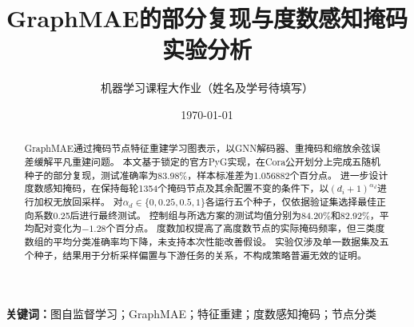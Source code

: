 \documentclass[UTF8,a4paper,zihao=-4,fontset=fandol]{ctexart}
\title{GraphMAE的部分复现与度数感知掩码实验分析}
\author{机器学习课程大作业（姓名及学号待填写）}
\date{\today}
\numberwithin{equation}{section}
\numberwithin{figure}{section}
\numberwithin{table}{section}
\newif\ifincludeFullAppendix
\begin{document}
\maketitle
\begin{abstract}
GraphMAE通过掩码节点特征重建学习图表示，以GNN解码器、重掩码和缩放余弦误差缓解平凡重建问题。
本文基于锁定的官方PyG实现，在Cora公开划分上完成五随机种子的部分复现，测试准确率为83.98\%，样本标准差为1.056882个百分点。
进一步设计度数感知掩码，在保持每轮1354个掩码节点及其余配置不变的条件下，以$(d_i+1)^{\alpha_d}$进行加权无放回采样。
对$\alpha_d\in\{0,0.25,0.5,1\}$各运行五个种子，仅依据验证集选择最佳正向系数0.25后进行最终测试。
控制组与所选方案的测试均值分别为84.20\%和82.92\%，平均配对变化为$-1.28$个百分点。
度数加权提高了高度数节点的实际掩码频率，但三类度数组的平均分类准确率均下降，未支持本次性能改善假设。
实验仅涉及单一数据集及五个种子，结果用于分析采样偏置与下游任务的关系，不构成策略普遍无效的证明。
\end{abstract}
\noindent\textbf{关键词：}图自监督学习；GraphMAE；特征重建；度数感知掩码；节点分类











\ifincludeFullAppendix
\clearpage
\appendix
\begingroup
\setstretch{1.0}
\fontsize{9}{11}\selectfont

\endgroup
\fi
\end{document}
